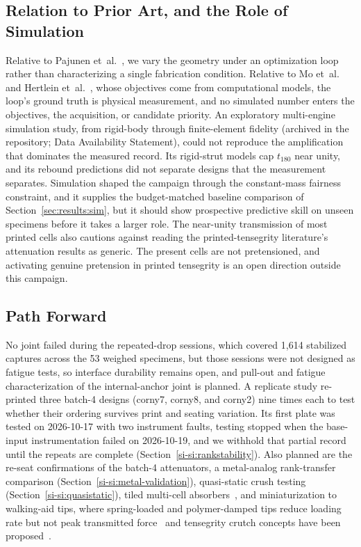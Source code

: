 \documentclass[lineno,nocopyright,upint,varvw,hyphenate]{asmejour}
\newcommand{\siref}[1]{\ref*{si-#1}}
\begin{document}
\subsection{Relation to Prior Art, and the Role of Simulation}
Relative
to Pajunen et~al.~\cite{pajunen2019design}, we vary the geometry under an
optimization loop rather than characterizing a single fabrication
condition. Relative to Mo et~al.~\cite{mo2023accelerated} and Hertlein
et~al.~\cite{hertlein2024latticeimpact}, whose objectives come from
computational models, the loop's ground truth is physical measurement,
and no simulated number enters the objectives, the acquisition, or
candidate priority. An exploratory
multi-engine simulation study, from rigid-body through finite-element
fidelity (archived in the repository; Data Availability Statement),
could not reproduce the amplification that dominates the measured
record. Its rigid-strut models cap $t_{180}$ near unity, and its rebound
predictions did not separate designs that the measurement separates.
Simulation shaped the campaign through the constant-mass fairness
constraint, and it supplies the budget-matched baseline comparison of
Section~\ref{sec:results:sim}, but it should show prospective predictive
skill on unseen specimens before it takes a larger role. The near-unity
transmission of most printed cells also cautions against reading the
printed-tensegrity literature's attenuation results as generic. The
present cells are not pretensioned, and activating genuine pretension in
printed tensegrity is an open direction outside this campaign.

\subsection{Path Forward}
No joint failed during the repeated-drop
sessions, which covered 1,614 stabilized captures across the 53 weighed
specimens, but those sessions were
not designed as fatigue tests, so interface durability remains open, and
pull-out and fatigue characterization of the internal-anchor joint is
planned. A replicate study re-printed three batch-4 designs (corny7,
corny8, and corny2) nine times each to test whether their ordering
survives print and seating variation. Its first plate was tested on
2026-10-17 with two instrument faults, testing stopped when the
base-input instrumentation failed on 2026-10-19, and we withhold that
partial record until the repeats are complete
(Section~\siref{si:rankstability}). Also planned are the re-seat confirmations of the batch-4
attenuators, a metal-analog rank-transfer comparison
(Section~\siref{si:metal-validation}), quasi-static crush testing
(Section~\siref{si:quasistatic}), tiled multi-cell
absorbers~\citep{sabounizawadzka2024experimental}, and miniaturization
to walking-aid tips, where spring-loaded and polymer-damped tips reduce
loading rate but not peak transmitted
force~\citep{segura2007mechanicsofambulation,
macgillivray2016theinfluenceof} and tensegrity crutch concepts have been
proposed~\citep{gu2026tensegritycrutches}.
\end{document}
